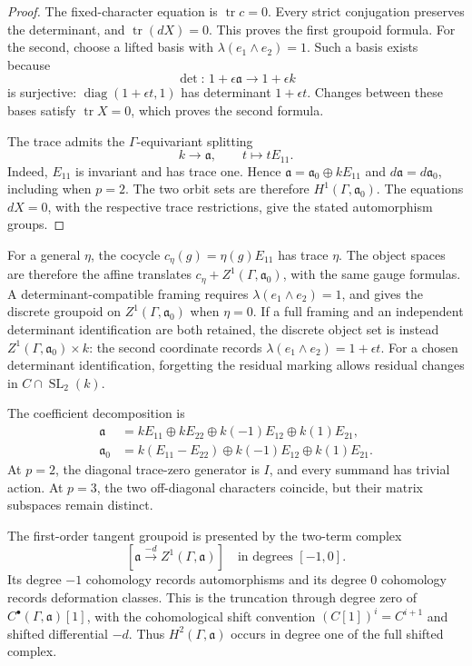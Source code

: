 \begin{proof}
The fixed-character equation is \(\operatorname{tr}c=0\).
Every strict conjugation preserves the determinant, and
\(\operatorname{tr}(dX)=0\). This proves the first groupoid formula.
For the second, choose a lifted basis with
\(\lambda(e_1\wedge e_2)=1\).
Such a basis exists because
\[
 \det:\,1+\epsilon\mathfrak a\longrightarrow1+\epsilon k
\]
is surjective: \(\operatorname{diag}(1+\epsilon t,1)\) has determinant
\(1+\epsilon t\). Changes between these bases satisfy
\(\operatorname{tr}X=0\), which proves the second formula.

The trace admits the \(\Gamma\)-equivariant splitting
\[
 k\longrightarrow\mathfrak a,\qquad t\longmapsto tE_{11}.
\]
Indeed, \(E_{11}\) is invariant and has trace one. Hence
\(\mathfrak a=\mathfrak a_0\oplus kE_{11}\) and
\(d\mathfrak a=d\mathfrak a_0\), including when \(p=2\).
The two orbit sets are therefore \(H^1(\Gamma,\mathfrak a_0)\).
The equations \(dX=0\), with the respective trace restrictions,
give the stated automorphism groups.
\end{proof}

For a general \(\eta\), the cocycle \(c_\eta(g)=\eta(g)E_{11}\) has trace
\(\eta\). The object spaces are therefore the affine translates
\(c_\eta+Z^1(\Gamma,\mathfrak a_0)\), with the same gauge formulas.
A determinant-compatible framing requires
\(\lambda(e_1\wedge e_2)=1\), and gives the discrete groupoid on
\(Z^1(\Gamma,\mathfrak a_0)\) when \(\eta=0\).
If a full framing and an independent determinant identification are both
retained, the discrete object set is instead
\(Z^1(\Gamma,\mathfrak a_0)\times k\): the second coordinate records
\(\lambda(e_1\wedge e_2)=1+\epsilon t\).
For a chosen determinant identification, forgetting the residual marking
allows residual changes in \(C\cap\operatorname{SL}_2(k)\).

The coefficient decomposition is
\begin{align*}
 \mathfrak a&=kE_{11}\oplus kE_{22}\oplus k(-1)E_{12}\oplus k(1)E_{21},\\
 \mathfrak a_0&=k(E_{11}-E_{22})\oplus k(-1)E_{12}\oplus k(1)E_{21}.
\end{align*}
At \(p=2\), the diagonal trace-zero generator is \(I\), and every
summand has trivial action. At \(p=3\), the two off-diagonal characters
coincide, but their matrix subspaces remain distinct.

The first-order tangent groupoid is presented by the two-term complex
\[
 [\mathfrak a\xrightarrow{-d}Z^1(\Gamma,\mathfrak a)]
 \quad\text{in degrees }[-1,0].
\]
Its degree \(-1\) cohomology records automorphisms and its degree \(0\)
cohomology records deformation classes. This is the truncation through
degree zero of \(C^\bullet(\Gamma,\mathfrak a)[1]\), with the cohomological
shift convention \((C[1])^i=C^{i+1}\) and shifted differential \(-d\).
Thus \(H^2(\Gamma,\mathfrak a)\) occurs in degree one of the full shifted complex.

